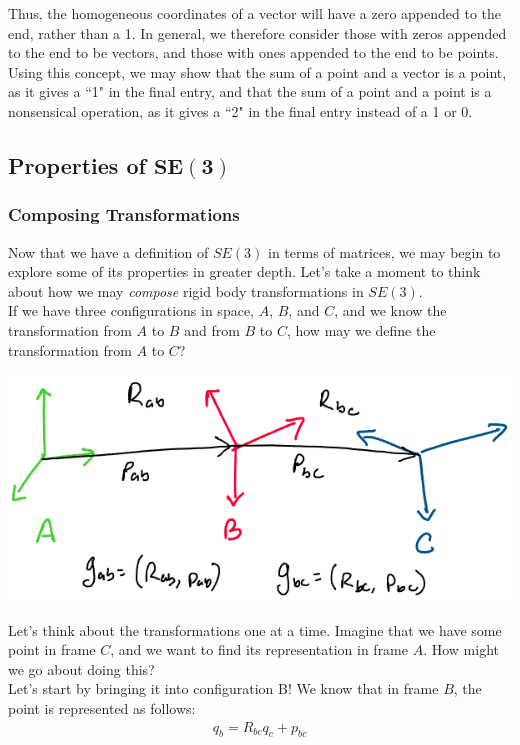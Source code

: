 \documentclass[oneside]{book}
\begin{document}
Thus, the homogeneous coordinates of a vector will have a zero appended to the end, rather than a 1. In general, we therefore consider those with zeros appended to the end to be vectors, and those with ones appended to the end to be points.\\
Using this concept, we may show that the sum of a point and a vector is a point, as it gives a ``1" in the final entry, and that the sum of a point and a point is a nonsensical operation, as it gives a ``2" in the final entry instead of a 1 or 0.

\subsection{Properties of $\mathbf{SE(3)}$}
\subsubsection{Composing Transformations}
Now that we have a definition of $SE(3)$ in terms of matrices, we may begin to explore some of its properties in greater depth. Let's take a moment to think about how we may \textit{compose} rigid body transformations in $SE(3)$.\\
If we have three configurations in space, $A$, $B$, and $C$, and we know the transformation from $A$ to $B$ and from $B$ to $C$, how may we define the transformation from $A$ to $C$?
\begin{center}
    \includegraphics[scale=0.5]{images/composition.png}
\end{center}
Let's think about the transformations one at a time. Imagine that we have some point in frame $C$, and we want to find its representation in frame $A$. How might we go about doing this?\\
Let's start by bringing it into configuration B! We know that in frame $B$, the point is represented as follows:
\begin{align}
    q_b = R_{bc}q_c + p_{bc}
\end{align}
\end{document}
